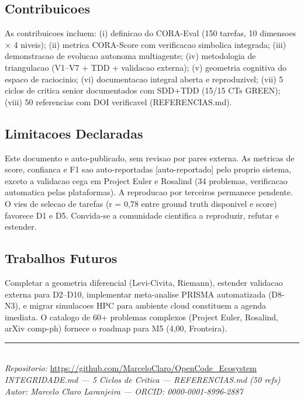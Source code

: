 \documentclass[12pt,a4paper,oneside]{article}
\begin{document}
\subsection{Contribuicoes}

As contribuicoes incluem: (i) definicao do CORA-Eval (150 tarefas, 10 dimensoes
$\times$ 4 niveis); (ii) metrica CORA-Score com verificacao simbolica integrada;
(iii) demonstracao de evolucao autonoma multiagente; (iv) metodologia de
triangulacao (V1--V7 + TDD + validacao externa); (v) geometria cognitiva do
espaco de raciocinio; (vi) documentacao integral aberta e reproduzivel;
(vii) 5 ciclos de critica senior documentados com SDD+TDD (15/15 CTs GREEN);
(viii) 50 referencias com DOI verificavel (REFERENCIAS.md).

\subsection{Limitacoes Declaradas}

Este documento e auto-publicado, sem revisao por pares externa. As metricas
de score, confianca e F1 sao auto-reportadas [auto-reportado] pelo proprio
sistema, exceto a validacao cega em Project Euler e Rosalind (34 problemas,
verificacao automatica pelas plataformas). A reproducao por terceiros permanece
pendente. O vies de selecao de tarefas (r = 0,78 entre ground truth disponivel
e score) favorece D1 e D5. Convida-se a comunidade cientifica a reproduzir,
refutar e estender.

\subsection{Trabalhos Futuros}

Completar a geometria diferencial (Levi-Civita, Riemann), estender validacao
externa para D2--D10, implementar meta-analise PRISMA automatizada (D8-N3),
e migrar simulacoes HPC para ambiente cloud constituem a agenda imediata.
O catalogo de 60+ problemas complexos (Project Euler, Rosalind, arXiv comp-ph)
fornece o roadmap para M5 (4,00, Fronteira).

\vspace{12pt}\begin{center}\rule{0.4\textwidth}{0.4pt}\\[6pt]
\textit{Repositorio:} \url{https://github.com/MarceloClaro/OpenCode\_Ecosystem}\\[3pt]
\textit{INTEGRIDADE.md — 5 Ciclos de Critica — REFERENCIAS.md (50 refs)}\\[3pt]
\textit{Autor: Marcelo Claro Laranjeira — ORCID: 0000-0001-8996-2887}
\end{center}
\end{document}
